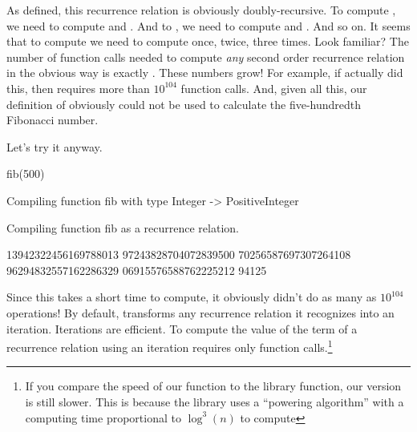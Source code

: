 As defined, this recurrence relation is obviously doubly-recursive.
To compute , we need to compute  and
.
And to  , we need to compute  and
.
And so on.
It seems that to compute  we need to compute
 once,  twice,  three times.
Look familiar?
The number of function calls needed to compute {\it any} second order
recurrence relation in the obvious way is exactly .
These numbers grow!
For example, if \Language{} actually did this, then 
requires more than $10^{104}$ function calls.
And, given all this, our definition of  obviously could not be
used to calculate the five-hundredth Fibonacci number.
\begin{xtc}
\begin{xtccomment}
Let's try it anyway.
\end{xtccomment}
\begin{spadsrc}
fib(500) 
\end{spadsrc}
\begin{MessageOutput}
   Compiling function fib with type Integer -> PositiveInteger 
\end{MessageOutput}
\begin{MessageOutput}
   Compiling function fib as a recurrence relation.
\end{MessageOutput}
\begin{TeXOutput}
\begin{fricasmath}{5}
13942322456169788013 97243828704072839500 70256587697307264108 96294832557162286329 06915576588762225212 94125%
\end{fricasmath}
\end{TeXOutput}
\end{xtc}

Since this takes a short time to compute, it obviously didn't do
as many as $10^{104}$ operations!
By default, \Language{} transforms any recurrence relation it recognizes
into an iteration.
Iterations are efficient.
To compute the value of the 
term of a recurrence relation using an iteration requires only
 function calls.\footnote{If
you compare the speed of our  function
to the library function, our version is still slower.
This is because the library
uses a ``powering algorithm'' with a computing time
proportional to $\log^3(n)$ to compute
}

